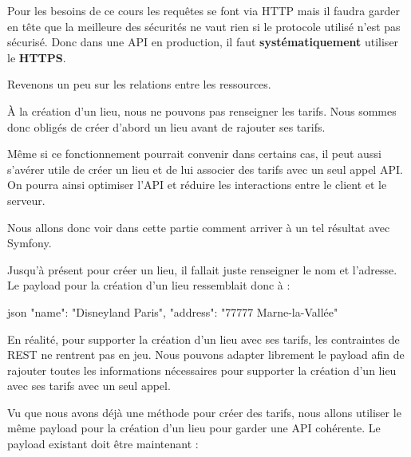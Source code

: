 \documentclass[big]{zmdocument}
\begin{document}
Pour les besoins de ce cours les requêtes se font via HTTP mais il faudra garder en tête que la meilleure des sécurités ne vaut rien si le protocole utilisé n'est pas sécurisé. Donc dans une API en production, il faut \textbf{systématiquement} utiliser le \textbf{HTTPS}.





Revenons un peu sur les relations entre les ressources.



À la création d'un lieu, nous ne pouvons pas renseigner les tarifs. Nous sommes donc obligés de créer d'abord un lieu avant de rajouter ses tarifs.



Même si ce fonctionnement pourrait convenir dans certains cas, il peut aussi s'avérer utile de créer un lieu et de lui associer des tarifs avec un seul appel API. On pourra ainsi optimiser l'API et réduire les interactions entre le client et le serveur.



Nous allons donc voir dans cette partie comment arriver à un tel résultat avec Symfony.





Jusqu'à présent pour créer un lieu, il fallait juste renseigner le nom et l'adresse. Le payload pour la création d'un lieu ressemblait donc à :



\begin{CodeBlock}{json}
{
    "name": "Disneyland Paris",
    "address": "77777 Marne-la-Vallée"
}
\end{CodeBlock}



En réalité, pour supporter la création d'un lieu avec ses tarifs, les contraintes de REST ne rentrent pas en jeu. Nous pouvons adapter librement le payload afin de rajouter toutes les informations nécessaires pour supporter la création d'un lieu avec ses tarifs avec un seul appel.







Vu que nous avons déjà une méthode pour créer des tarifs, nous allons utiliser le même payload pour la création d'un lieu pour garder une API cohérente. Le payload existant doit être maintenant :
\end{document}
